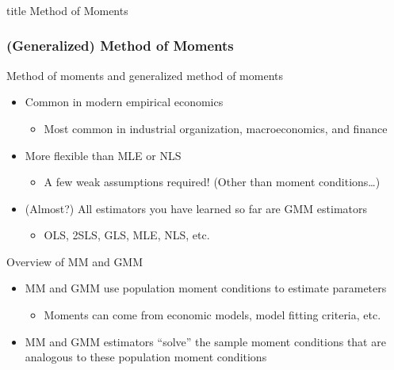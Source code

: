 \documentclass{beamer}
\begin{document}
\begin{frame}\frametitle{}
    \vfill
    \centering
    \begin{beamercolorbox}[center]{title}
        \Large Method of Moments
    \end{beamercolorbox}
    \vfill
\end{frame}

\begin{frame}\frametitle{(Generalized) Method of Moments}
    Method of moments and generalized method of moments
    \begin{itemize}
    	\item Common in modern empirical economics
    	\begin{itemize}
    		\item Most common in industrial organization, macroeconomics, and finance
    	\end{itemize}
    	\item More flexible than MLE or NLS
    	\begin{itemize}
    		\item A few weak assumptions required! (Other than moment conditions\ldots)
    	\end{itemize}
    	\item (Almost?) All estimators you have learned so far are GMM estimators
    	\begin{itemize}
    		\item OLS, 2SLS, GLS, MLE, NLS, etc.
    	\end{itemize}
    \end{itemize}
    \vspace{2ex}
    Overview of MM and GMM
    \begin{itemize}
    	\item MM and GMM use population moment conditions to estimate parameters
    	\begin{itemize}
    		\item Moments can come from economic models, model fitting criteria, etc.
    	\end{itemize}
    	\item MM and GMM estimators ``solve'' the sample moment conditions that are analogous to these population moment conditions
    \end{itemize}
\end{frame}
\end{document}

